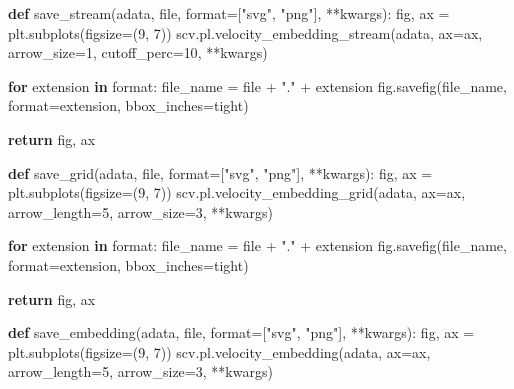 \documentclass[
  letterpaper,
  DIV=11,
  numbers=noendperiod]{scrreprt}
\newenvironment{Shaded}{\begin{snugshade}}{\end{snugshade}}
\newcommand{\BuiltInTok}[1]{\textcolor[rgb]{0.00,0.23,0.31}{#1}}
\newcommand{\ControlFlowTok}[1]{\textcolor[rgb]{0.00,0.23,0.31}{\textbf{#1}}}
\newcommand{\DecValTok}[1]{\textcolor[rgb]{0.68,0.00,0.00}{#1}}
\newcommand{\KeywordTok}[1]{\textcolor[rgb]{0.00,0.23,0.31}{\textbf{#1}}}
\newcommand{\NormalTok}[1]{\textcolor[rgb]{0.00,0.23,0.31}{#1}}
\newcommand{\OperatorTok}[1]{\textcolor[rgb]{0.37,0.37,0.37}{#1}}
\newcommand{\StringTok}[1]{\textcolor[rgb]{0.13,0.47,0.30}{#1}}
\begin{document}
\begin{Shaded}
\begin{Highlighting}[]
\KeywordTok{def}\NormalTok{ save\_stream(adata, }\BuiltInTok{file}\NormalTok{, }\BuiltInTok{format}\OperatorTok{=}\NormalTok{[}\StringTok{"svg"}\NormalTok{, }\StringTok{"png"}\NormalTok{], }\OperatorTok{**}\NormalTok{kwargs):}
\NormalTok{    fig, ax }\OperatorTok{=}\NormalTok{ plt.subplots(figsize}\OperatorTok{=}\NormalTok{(}\DecValTok{9}\NormalTok{, }\DecValTok{7}\NormalTok{))  }
\NormalTok{    scv.pl.velocity\_embedding\_stream(adata, ax}\OperatorTok{=}\NormalTok{ax, arrow\_size}\OperatorTok{=}\DecValTok{1}\NormalTok{, cutoff\_perc}\OperatorTok{=}\DecValTok{10}\NormalTok{, }\OperatorTok{**}\NormalTok{kwargs)}
    
    \ControlFlowTok{for}\NormalTok{ extension }\KeywordTok{in} \BuiltInTok{format}\NormalTok{:}
\NormalTok{        file\_name }\OperatorTok{=} \BuiltInTok{file} \OperatorTok{+} \StringTok{"."} \OperatorTok{+}\NormalTok{ extension}
\NormalTok{        fig.savefig(file\_name, }\BuiltInTok{format}\OperatorTok{=}\NormalTok{extension, bbox\_inches}\OperatorTok{=}\StringTok{\textquotesingle{}tight\textquotesingle{}}\NormalTok{)}
    
    \ControlFlowTok{return}\NormalTok{ fig, ax  }


\KeywordTok{def}\NormalTok{ save\_grid(adata, }\BuiltInTok{file}\NormalTok{, }\BuiltInTok{format}\OperatorTok{=}\NormalTok{[}\StringTok{"svg"}\NormalTok{, }\StringTok{"png"}\NormalTok{], }\OperatorTok{**}\NormalTok{kwargs):}
\NormalTok{    fig, ax }\OperatorTok{=}\NormalTok{ plt.subplots(figsize}\OperatorTok{=}\NormalTok{(}\DecValTok{9}\NormalTok{, }\DecValTok{7}\NormalTok{))  }
\NormalTok{    scv.pl.velocity\_embedding\_grid(adata, ax}\OperatorTok{=}\NormalTok{ax, arrow\_length}\OperatorTok{=}\DecValTok{5}\NormalTok{, arrow\_size}\OperatorTok{=}\DecValTok{3}\NormalTok{, }\OperatorTok{**}\NormalTok{kwargs) }

    \ControlFlowTok{for}\NormalTok{ extension }\KeywordTok{in} \BuiltInTok{format}\NormalTok{:}
\NormalTok{        file\_name }\OperatorTok{=} \BuiltInTok{file} \OperatorTok{+} \StringTok{"."} \OperatorTok{+}\NormalTok{ extension}
\NormalTok{        fig.savefig(file\_name, }\BuiltInTok{format}\OperatorTok{=}\NormalTok{extension, bbox\_inches}\OperatorTok{=}\StringTok{\textquotesingle{}tight\textquotesingle{}}\NormalTok{)}
    
    \ControlFlowTok{return}\NormalTok{ fig, ax }


\KeywordTok{def}\NormalTok{ save\_embedding(adata, }\BuiltInTok{file}\NormalTok{, }\BuiltInTok{format}\OperatorTok{=}\NormalTok{[}\StringTok{"svg"}\NormalTok{, }\StringTok{"png"}\NormalTok{], }\OperatorTok{**}\NormalTok{kwargs):}
\NormalTok{    fig, ax }\OperatorTok{=}\NormalTok{ plt.subplots(figsize}\OperatorTok{=}\NormalTok{(}\DecValTok{9}\NormalTok{, }\DecValTok{7}\NormalTok{)) }
\NormalTok{    scv.pl.velocity\_embedding(adata, ax}\OperatorTok{=}\NormalTok{ax, arrow\_length}\OperatorTok{=}\DecValTok{5}\NormalTok{, arrow\_size}\OperatorTok{=}\DecValTok{3}\NormalTok{, }\OperatorTok{**}\NormalTok{kwargs)  }
    

\end{Highlighting}
\end{Shaded}
\end{document}
